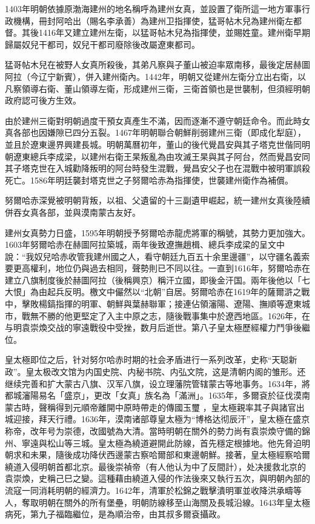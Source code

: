 1403年明朝依據原渤海建州的地名稱呼為建州女真，並設置了衛所這一地方軍事行政機構，冊封阿哈出（賜名李承善）為建州卫指揮使，猛哥帖木兒為建州衛左都督。其後1416年又建立建州左衛，以猛哥帖木兒為指揮使，並賜姓童。建州衛早期歸屬奴兒干都司，奴兒干都司廢除後改屬遼東都司。

猛哥帖木兒在被野人女真所殺後，其弟凡察與子董山被迫率眾南移，最後定居赫圖阿拉（今辽宁新賓），併入建州衛內。1442年，明朝又從建州左衛分立出右衛，以凡察領導右衛、董山領導左衛，形成建州三衛，三衛首領也是世襲制，但須經明朝政府認可後方生效。

由於建州三衛對明朝過度干預女真產生不滿，因而逐漸不遵守朝廷命令。而此時女真各部也因嫌隙已四分五裂。1467年明朝聯合朝鮮削弱建州三衛（即成化犁庭），並且於遼東邊界興建長城。明朝萬曆初年，董山的後代覺昌安與其子塔克世偕同明朝遼東總兵李成梁，以建州右衛王杲叛亂為由攻滅王杲與其子阿台，然而覺昌安同其子塔克世在入城勸降叛明的阿台時發生混戰，覺昌安父子也在混戰中被明軍誤殺死亡。1586年明廷襲封塔克世之子努爾哈赤為指揮使，世襲建州衛作為補償。

努爾哈赤深覺被明朝背叛，以祖、父遺留的十三副遺甲崛起，統一建州女真後陸續併吞女真各部，並與漠南蒙古友好。

建州女真勢力日盛，1595年明朝授予努爾哈赤龍虎將軍的稱號，其勢力更加強大。1603年努爾哈赤在赫圖阿拉築城，兩年後致遼撫趙楫、總兵李成梁的呈文中說：“我奴兒哈赤收管我建州國之人，看守朝廷九百五十余里邊疆”，以守疆名義索要更高權利，地位仍與過去相同，聲勢則已不同以往。一直到1616年，努爾哈赤在建立八旗制度後於赫圖阿拉（後稱興京）稱汗立國，即後金汗国。兩年後他以「七大恨」為由起兵反明。檄文中儼然以“北朝”自居。努爾哈赤在1619年的薩爾滸之戰中，擊敗楊鎬指揮的明軍、朝鮮與葉赫聯軍；接連佔領瀋陽、遼陽、撫順等遼東城市，戰無不勝的他更堅定了入主中原之志，隨後戰事集中於遼西地區。1626年，在与明袁崇煥交战的寧遠戰役中受挫，数月后逝世。第八子皇太極歷經權力鬥爭後繼位。

皇太極即位之后，针对努尔哈赤时期的社会矛盾进行一系列改革，史称“天聪新政”。皇太极改文馆为内国史院、内秘书院、内弘文院，这是清朝内阁的雏形。还继续完善和扩大蒙古八旗、汉军八旗，设立理藩院管辖蒙古等地事务。1634年，將都城瀋陽易名「盛京」，更改「女真」族名為「滿洲」。1635年，多爾袞於征伐漠南蒙古時，聲稱得到元順帝離開中原時帶走的傳國玉璽 ，皇太極親率其子與諸官出城迎接，拜天行禮。1636年，漠南诸部尊皇太極为“博格达彻辰汗”，皇太極在盛京称帝，改年号为崇德，改國號為大清。當時明朝在關外的勢力尚有袁崇煥守備的錦州、寧遠與松山等三城。皇太極為繞道避開此防線，首先穩定根據地。他先脅迫明朝求和未果，隨後成功降伏西邊蒙古察哈爾部和東邊朝鮮。接著，皇太極經察哈爾繞道入侵明朝首都北京。最後崇禎帝（有人他认为中了反間計），处决援救北京的袁崇煥，史稱己巳之變。這種藉由繞道入侵的作法後來又執行五次，與明朝內部的流寇一同消耗明朝的經濟力。1642年，清軍於松錦之戰擊潰明軍並收降洪承疇等人，奪取明朝在關外的所有堡壘，明朝防線移至山海關及長城沿線。1643年皇太極病死，第九子福臨繼位，是為順治帝，由其叔多爾袞攝政。

